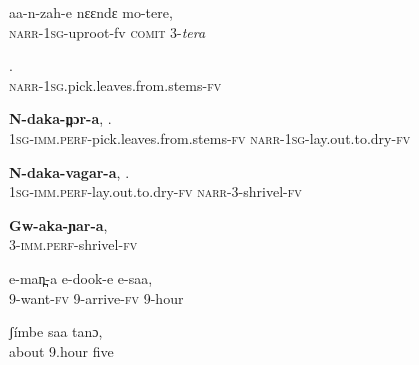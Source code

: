 \documentclass[output=paper]{LSP/langsci}
\begin{document}
 \begin{exe}
\ex \label{Saapp6}
\gll aa-n-zah-e nɛɛndɛ mo-tere,\\
\textsc{narr}-\textsc{1sg}-uproot-fv   \textsc{comit}   3-\textit{tera}\\
\glt {}
\end{exe}

 \begin{exe}
\ex \label{Saapp7}
\gll \underline{}.\\
\textsc{narr-1sg.}pick.leaves.from.stems\textsc{-fv}\\
\glt {}
\end{exe}

 \begin{exe}
\ex \label{Saapp8}
\gll \textbf{N-daka-n̪ɔr-a},          \underline{}.\\
1\textsc{sg}-\textsc{imm.perf-}pick.leaves.from.stems-\textsc{fv}  \textsc{narr-1sg}-lay.out.to.dry-\textsc{fv}\\
\glt {}
\end{exe}

 \begin{exe}
\ex \label{Saapp9}
\gll \textbf{N-daka-vagar-a},      \underline{}.\\
\textsc{1sg-imm.perf-}lay.out.to.dry-\textsc{fv}  \textsc{narr-3}-shrivel-\textsc{fv}\\
\glt {}
\end{exe}

 \begin{exe}
\ex \label{Saapp10}
\gll \textbf{Gw-aka-ɲar-a},\\
3-\textsc{imm.perf-}shrivel-\textsc{fv}\\
\glt {}
\end{exe}

 \begin{exe}
\ex \label{Saapp11}
\gll e-man̪-a e-dook-e e-saa,\\
9-want-\textsc{fv}  9-arrive-\textsc{fv}  9-hour\\
\glt {}
\end{exe}

 \begin{exe}
\ex \label{Saapp12}
\gll ʃímbe saa tanɔ,\\
about 9.hour  five\\
\glt {}
\end{exe}
\end{document}
